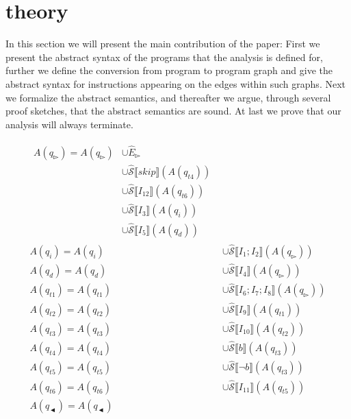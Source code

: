 \section{theory}\label{sec:theory}
In this section we will present the main contribution of the paper:
First we present the abstract syntax of the programs that the analysis is defined for, further we define the conversion from program to program graph and give the abstract syntax for instructions appearing on the edges within such graphs.
Next we formalize the abstract semantics, and thereafter we argue, through several proof sketches, that the abstract semantics are sound.
At last we prove that our analysis will always terminate.






\begin{align}\label{eq:exaple equation}
    \begin{split}
    A(q_\whitepointerright)=A(q_\whitepointerright) &\cup \hat E_\whitepointerright \\&\cup \mathcal{\hat S} \lBrack skip \rBrack(A(q_{t4}))\\&\cup \mathcal{\hat S} \lBrack I_{12} \rBrack (A(q_{t6})) \\&\cup \mathcal{\hat S} \lBrack I_3 \rBrack (A(q_i)) \\&\cup \mathcal{\hat S} \lBrack I_5 \rBrack (A(q_d))
    \end{split}\\
    A(q_i)=A(q_i)&\cup \mathcal{\hat S} \lBrack I_1;I_2 \rBrack (A(q_\whitepointerright ))\\
    A(q_d)=A(q_d)&\cup \mathcal{\hat S} \lBrack I_4 \rBrack (A(q_\whitepointerright ))\\
    A(q_{t1})=A(q_{t1})&\cup \mathcal{\hat S} \lBrack I_6;I_7;I_8 \rBrack (A(q_\whitepointerright))\\
    A(q_{t2})=A(q_{t2})&\cup \mathcal{\hat S} \lBrack I_9 \rBrack (A(q_{t1}))\\
    A(q_{t3})=A(q_{t3})&\cup \mathcal{\hat S} \lBrack I_{10} \rBrack (A(q_{t2}))\\
    A(q_{t4})=A(q_{t4})&\cup \mathcal{\hat S} \lBrack b \rBrack (A(q_{t3}))\\
    A(q_{t5})=A(q_{t5})&\cup \mathcal{\hat S} \lBrack \neg b \rBrack (A(q_{t3}))\\
    A(q_{t6})=A(q_{t6})&\cup \mathcal{\hat S} \lBrack I_{11} \rBrack (A(q_{t5}))\\
    A(q_\blackpointerleft)=A(q_\blackpointerleft)
\end{align}